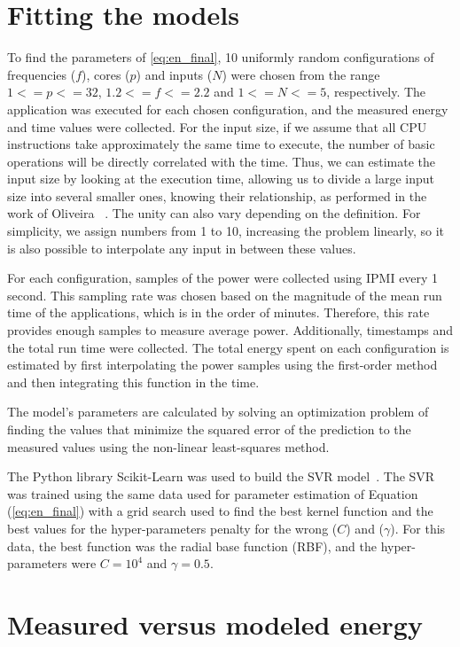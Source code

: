 \section{Fitting the models} \label{subsec:fitting_the_models}
To find the parameters of  \cref{eq:en_final}, 10 uniformly random configurations of frequencies ($f$), cores ($p$) and inputs ($N$) were chosen from the range $1<=p<=32$, $1.2<=f<=2.2$ and $1<=N<=5$, respectively. The application was executed for each chosen configuration, and the measured energy and time values were collected. For the input size, if we assume that all CPU instructions take approximately the same time to execute, the number of basic operations will be directly correlated with the time. Thus, we can estimate the input size by looking at the execution time, allowing us to divide a large input size into several smaller ones, knowing their relationship, as performed in the work of Oliveira ~\cite{Oliveira2018ApplicationCharacterization}. The unity can also vary depending on the definition. For simplicity, we assign numbers from 1 to 10, increasing the problem linearly, so it is also possible to interpolate any input in between these values.

For each configuration, samples of the power were collected using IPMI every 1 second. This sampling rate was chosen based on the magnitude of the mean run time of the applications, which is in the order of minutes. Therefore, this rate provides enough samples to measure average power. Additionally, timestamps and the total run time were collected. The total energy spent on each configuration is estimated by first interpolating the power samples using the first-order method and then integrating this function in the time.

The model's parameters are calculated by solving an optimization problem of finding the values that minimize the squared error of the prediction to the measured values using the non-linear least-squares method.

The Python library Scikit-Learn was used to build the SVR model~\cite{Pedregosa2011Scikit-learn:Python}. The SVR was trained using the same data used for parameter estimation of Equation (\ref{eq:en_final}) %
with a grid search used to find the best kernel function and the best values for the hyper-parameters penalty for the wrong ($C$) and ($\gamma$). For this data, the best function was the radial base function (RBF), and the hyper-parameters were $C=10^4$ and $\gamma=0.5$.


\section{Measured versus modeled energy} \label{sec:measured_versus_modeled_energy}

